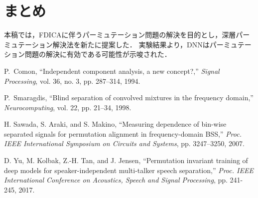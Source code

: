 \documentclass[a4j]{jsarticle}
\begin{document}
\section{まとめ}
本稿では，FDICAに伴うパーミュテーション問題の解決を目的とし，深層パーミュテーション解決法を新たに提案した．
実験結果より，DNNはパーミュテーション問題の解決に有効である可能性が示唆された．

\begin{thebibliography}{9}%
\scriptsize{
P.~Comon, ``Independent component analysis, a new concept?,'' \textit{Signal Processing}, vol. 36, no. 3, pp. 287--314, 1994.

P.~Smaragdis, ``Blind separation of convolved mixtures in the frequency domain,'' \textit{Neurocomputing}, vol. 22, pp. 21--34, 1998.

H. Sawada, S. Araki, and S. Makino, ``Measuring dependence of bin-wise separated signals for permutation alignment in frequency-domain BSS,'' \textit{Proc. IEEE International Symposium on Circuits and Systems}, pp. 3247--3250, 2007.

D. Yu, M. Kolbak, Z.-H. Tan, and J. Jensen, ``Permutation invariant training of deep models for speaker-independent multi-talker speech separation,'' \textit{Proc. IEEE International Conference on Acoustics, Speech and Signal Processing}, pp. 241-245, 2017. 
}
\end{thebibliography}
\end{document}
